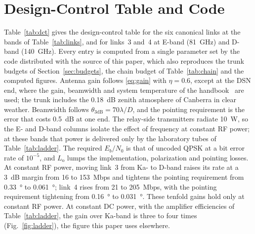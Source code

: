 \documentclass{IEEEoj}
\begin{document}
\section{Design-Control Table and Code}
\label{app:dct}
Table~\ref{tab:dct} gives the design-control table for the six canonical links at the bands of Table~\ref{tab:links}, and for links~3 and~4 at E-band (\SI{81}{GHz}) and D-band (\SI{140}{GHz}). Every entry is computed from a single parameter set by the code distributed with the source of this paper, which also reproduces the trunk budgets of Section~\ref{sec:budgets}, the chain budget of Table~\ref{tab:chain} and the computed figures. Antenna gain follows \eqref{eq:gain} with $\eta = 0.6$, except at the DSN end, where the gain, beamwidth and system temperature of the handbook~\cite{dsn_34m_bwg} are used; the trunk includes the \SI{0.18}{dB} zenith atmosphere of Canberra in clear weather. Beamwidth follows $\theta_{3\mathrm{dB}} = 70\lambda/D$, and the pointing requirement is the error that costs \SI{0.5}{dB} at one end. The relay-side transmitters radiate \SI{10}{W}, so the E- and D-band columns isolate the effect of frequency at constant RF power; at these bands that power is delivered only by the laboratory tubes of Table~\ref{tab:ladder}. The required $E_b/N_0$ is that of uncoded QPSK at a bit error rate of $10^{-5}$, and $L_{\mathrm{o}}$ lumps the implementation, polarization and pointing losses. At constant RF power, moving link~3 from Ka- to D-band raises its rate at a \SI{3}{dB} margin from 16 to \SI{153}{Mbps} and tightens the pointing requirement from \SI{0.33}{\degree} to \SI{0.061}{\degree}; link~4 rises from 21 to \SI{205}{Mbps}, with the pointing requirement tightening from \SI{0.16}{\degree} to \SI{0.031}{\degree}. These tenfold gains hold only at constant RF power. At constant DC power, with the amplifier efficiencies of Table~\ref{tab:ladder}, the gain over Ka-band is three to four times (Fig.~\ref{fig:ladder}), the figure this paper uses elsewhere.

\clearpage
\onecolumn\twocolumn


\end{document}
